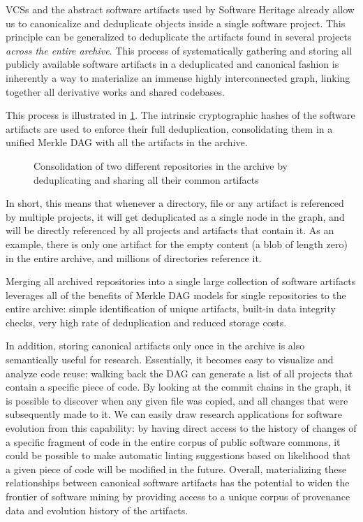 \glspl{VCS} and the abstract software artifacts used by Software Heritage
already allow us to canonicalize and deduplicate objects inside a single
software project. This principle can be generalized to deduplicate the
artifacts found in several projects \emph{across the entire archive}.
This process of systematically gathering and storing all publicly available
software artifacts in a deduplicated and canonical fashion is inherently a way
to materialize an immense highly interconnected graph, linking together all
derivative works and shared codebases.

This process is illustrated in \cref{fig:consolidating-archive}. The
intrinsic cryptographic hashes of the software artifacts are used to enforce
their full deduplication, consolidating them in a unified Merkle \gls{DAG} with
all the artifacts in the archive.

\begin{figure}
    \centering
    
    \caption{Consolidation of two different repositories in the archive by
    deduplicating and sharing all their common artifacts}%
    \label{fig:consolidating-archive}
\end{figure}

In short, this means that whenever a directory, file or any artifact is
referenced by multiple projects, it will get deduplicated as a single node in
the graph, and will be directly referenced by all projects and artifacts
that contain it. As an example, there is only one artifact for the empty
content (a blob of length zero) in the entire archive, and millions of
directories reference it.

Merging all archived repositories into a single large collection of software
artifacts leverages all of the benefits of Merkle \gls{DAG} models for single
repositories to the entire archive: simple identification of unique artifacts,
built-in data integrity checks, very high rate of deduplication and reduced
storage costs.

In addition, storing canonical artifacts only once in the archive is also
semantically useful for research. Essentially, it becomes easy to visualize
and analyze code reuse: walking back the \gls{DAG} can generate a list of all
projects that contain a specific piece of code. By looking at the commit
chains in the graph, it is possible to discover when any given file was copied,
and all changes that were subsequently made to it.
We can easily draw research applications for software evolution from this
capability: by having direct access to the history of changes of a specific
fragment of code in the entire corpus of public software commons, it could be
possible to make automatic linting suggestions based on likelihood that a given
piece of code will be modified in the future. Overall, materializing these
relationships between canonical software artifacts has the potential to widen
the frontier of software mining by providing access to a unique corpus of
provenance data and evolution history of the artifacts.



